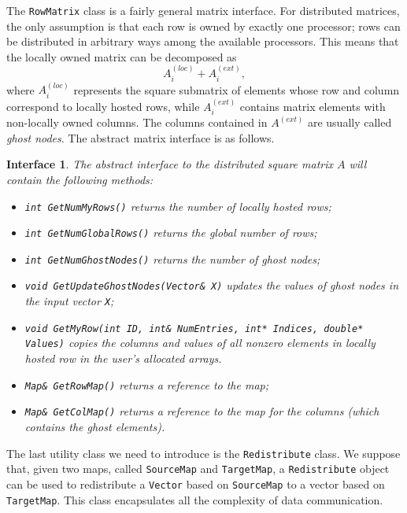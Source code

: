 \documentclass[acmtocl]{acmtrans2m}
\newtheorem{interface}{Interface}[section]
\begin{document}
The {\tt RowMatrix} class is a fairly general matrix interface. For
distributed matrices, the only assumption is that each row is owned by exactly
one processor; rows can be distributed in arbitrary ways among the available
processors. This means that the locally owned matrix can be decomposed as
\begin{equation}
A^{(loc)}_i + A^{(ext)}_i,
\end{equation}
where $A^{(loc)}_i$ represents the square submatrix of elements whose row
and column correspond to locally hosted rows, while
$A^{(ext)}_i$ contains matrix elements with non-locally owned columns. The
columns contained in $A^{(ext)}$ are usually called {\sl ghost nodes}.
The abstract matrix interface is as
follows.
\begin{interface}
\label{int:ami}
The abstract interface to the distributed square matrix $A$
will contain the following methods:
\begin{itemize}
\item \verb!int GetNumMyRows()! returns the number of locally hosted rows;
\item \verb!int GetNumGlobalRows()! returns the global number of rows;
\item \verb!int GetNumGhostNodes()! returns the number of ghost nodes;
\item \verb!void GetUpdateGhostNodes(Vector& X)! updates the values of ghost nodes
 in the input vector {\tt X};
\item {\tt void GetMyRow(int ID, int\& NumEntries, int* Indices, double*
                             Values)} copies the
columns and values of all nonzero elements in locally hosted row 
in the user's allocated arrays.
\item \verb!Map& GetRowMap()! returns a reference to the map;
\item \verb!Map& GetColMap()! returns a reference to the map for the columns
(which contains the ghost elements).
\end{itemize}
\end{interface}

\smallskip

The last utility class we need to introduce is the {\tt Redistribute} class.
We suppose that, given two maps, called {\tt SourceMap} and {\tt TargetMap}, a
{\tt Redistribute} object can be used to redistribute a {\tt Vector} based on
{\tt SourceMap} to a vector based on {\tt TargetMap}. This class encapsulates
all the complexity of data communication.

\smallskip
\end{document}
